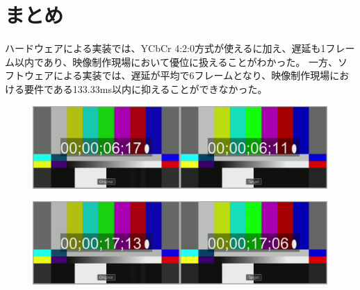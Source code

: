 
\section{まとめ}

ハードウェアによる実装では、YCbCr 4:2:0方式が使えるに加え、遅延も1フレーム以内であり、映像制作現場において優位に扱えることがわかった。
一方、ソフトウェアによる実装では、遅延が平均で6フレームとなり、映像制作現場における要件である133.33ms以内に抑えることができなかった。

\begin{figure}[htbp]
  \begin{center}
    \includegraphics[bb=0 0 1920 540,width=14cm]{img/evaluate-delay-software-1.png}
  \end{center}
  \caption[ソフトウェア実装による1回目の遅延計測のキャプチャー画像]{}
  \label{fig:evaluate-delay-software-1}
\end{figure}

\begin{figure}[htbp]
  \begin{center}
    \includegraphics[bb=0 0 1920 540,width=14cm]{img/evaluate-delay-software-2.png}
  \end{center}
  \caption[ソフトウェア実装による4回目の遅延計測のキャプチャー画像]{}
  \label{fig:evaluate-delay-software-2}
\end{figure}

